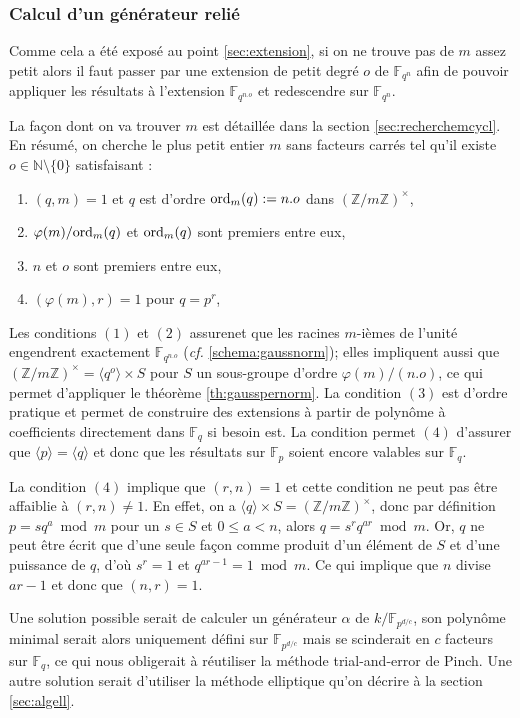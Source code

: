 \documentclass[a4paper]{article} %
\numberwithin{section}{part}
\numberwithin{equation}{section}
\newcommand\zmodninv[1]{(\mathbb{Z}/#1\mathbb{Z})^{\times}}
\newcommand\GF[1]{\mathbb{F}_{#1}}
\newcommand\NN{\mathbb{N}}
\newcommand\groupgen[1]{\langle{#1}\rangle}
\newcommand\ord[2]{\textup{ord}_{#1}(#2)}
\begin{document}
\subsubsection*{Calcul d'un générateur relié}
Comme cela a été exposé au point \ref{sec:extension}, si on ne trouve pas de $m$
assez petit alors il faut passer par une extension de petit degré $o$ de
$\GF{q^n}$ afin de pouvoir appliquer les résultats à l'extension $\GF{q^{n.o}}$
et redescendre sur $\GF{q^n}$.\par
La façon dont on va trouver $m$ est détaillée dans la section
\ref{sec:recherchemcycl}. En résumé, on cherche le plus petit entier
$m$ sans facteurs carrés tel qu'il existe $o\in\NN\setminus\lbrace{0}\rbrace$ 
satisfaisant :
\vspace{0.3cm}
\begin{enumerate}[(1)]
    \item $(q, m) = 1$ et $q$ est d'ordre $\ord{m}{q} :=n.o$ dans 
    $\zmodninv{m}$,
    \item $\varphi(m)/\ord{m}{q}$ et $\ord{m}{q}$ sont premiers entre eux,
    \item $n$ et $o$ sont premiers entre eux,
    \item $(\varphi(m), r) = 1$ pour $q = p^r$,
\end{enumerate}
\vspace{0.3cm}
Les conditions $(1)$ et $(2)$ assurenet que les racines $m$-ièmes de l'unité
engendrent exactement $\GF{q^{n.o}}$ (\emph{cf.} 
\ref{schema:gaussnorm}); elles impliquent aussi que $\zmodninv{m} =
\groupgen{q^o}\times S$ pour $S$ un sous-groupe d'ordre $\varphi(m)/(n.o)$, ce
qui permet d'appliquer le théorème \ref{th:gausspernorm}. La condition $(3)$ est
d'ordre pratique et permet de construire des extensions à partir de polynôme à 
coefficients directement dans $\GF{q}$ si besoin est. La condition permet $(4)$ 
d'assurer que $\groupgen{p} = \groupgen{q}$ et donc que les résultats sur
$\GF{p}$ soient encore valables sur $\GF{q}$.
\begin{rem}
La condition $(4)$ implique que $(r,n) = 1$ et cette condition ne peut pas être
affaiblie à $(r,n)\neq1$. En effet, on a $\groupgen{q}\times S = \zmodninv{m}$, 
donc par définition $p = sq^a\bmod m$ pour un $s\in S$ et $0 \leq a < n$, alors 
$q=s^rq^{ar} \bmod m$. Or, $q$ ne peut être écrit que d'une seule façon comme 
produit d'un élément de $S$ et d'une puissance de $q$, d'où $s^r = 1$ et $q^{ar 
- 1} = 1 \bmod m$. Ce qui implique que $n$ divise $ar - 1$ et donc que $(n, r) =
1$.\par
Une solution possible serait de calculer un générateur $\alpha$ de 
$k/\GF{p^{d/c}}$, son polynôme minimal serait alors uniquement défini sur 
$\GF{p^{d/c}}$ mais se scinderait en $c$ facteurs sur $\GF{q}$, ce qui nous 
obligerait à réutiliser la méthode trial-and-error de Pinch. Une autre solution
serait d'utiliser la méthode elliptique qu'on décrire à la section
\ref{sec:algell}.
\end{rem}
\end{document}
